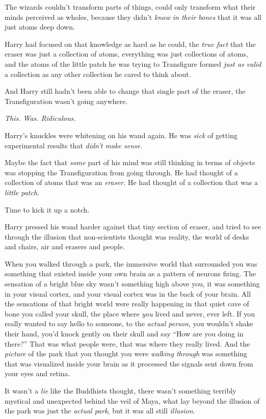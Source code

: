 The wizards couldn’t transform parts of things, could only transform what their minds perceived as wholes, because they didn’t \emph{know in their bones} that it was all just atoms deep down.

Harry had focused on that knowledge as hard as he could, the \emph{true fact} that the eraser was just a collection of atoms, everything was just collections of atoms, and the atoms of the little patch he was trying to Transfigure formed \emph{just as valid} a collection as any other collection he cared to think about.

And Harry still hadn’t been able to change that single part of the eraser, the Transfiguration wasn’t going anywhere.

\emph{This. Was. Ridiculous.}

Harry’s knuckles were whitening on his wand again. He was \emph{sick} of getting experimental results that \emph{didn’t make sense.}

Maybe the fact that \emph{some} part of his mind was still thinking in terms of objects was stopping the Transfiguration from going through. He had thought of a collection of atoms that was an \emph{eraser.} He had thought of a collection that was a \emph{little patch.}

Time to kick it up a notch.

Harry pressed his wand harder against that tiny section of eraser, and tried to see through the illusion that non-scientists thought was reality, the world of desks and chairs, air and erasers and people.

When you walked through a park, the immersive world that surrounded you was something that existed inside your own brain as a pattern of neurons firing. The sensation of a bright blue sky wasn’t something high above you, it was something in your visual cortex, and your visual cortex was in the back of your brain. All the sensations of that bright world were really happening in that quiet cave of bone you called your skull, the place where \emph{you} lived and never, ever left. If you really wanted to say hello to someone, to the \emph{actual person,} you wouldn’t shake their hand, you’d knock gently on their skull and say “How are you doing in there?” That was what people were, that was where they really lived. And the \emph{picture} of the park that you thought you were \emph{walking through} was something that was visualized inside your brain as it processed the signals sent down from your eyes and retina.

It wasn’t a \emph{lie} like the Buddhists thought, there wasn’t something terribly mystical and unexpected behind the veil of Maya, what lay beyond the illusion of the park was just the \emph{actual park}, but it was all still \emph{illusion}.

